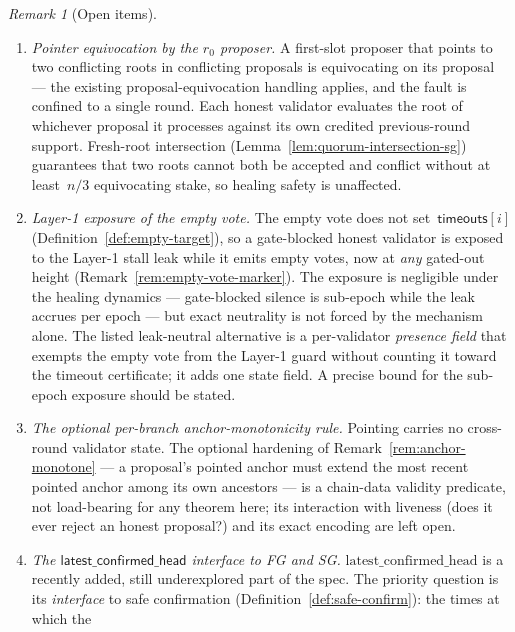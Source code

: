 \ifx\litemode\undefined\documentclass{article}\fi
\newcommand{\timeouts}{\mathsf{timeouts}}
\newcommand{\rzero}{\ensuremath{r_{0}}}                 %
\newcommand{\latestConfirmed}{\textsf{latest\_confirmed\_head}\xspace}
\theoremstyle{plain}
\theoremstyle{definition}
\theoremstyle{remark}
\newtheorem{remark}[theorem]{Remark}
\begin{document}
\begin{remark}[Open items]
\begin{enumerate}[label=(\arabic*)]
    stabilization beyond Goldfish requires \(2/3\) support in any case
    (Remark~\ref{rem:sub-two-thirds}), and finality-restoration in this regime is
    left to the leak (Theorem~\ref{thm:tightness}).
  \item \emph{Pointer equivocation by the \(\rzero\) proposer.}
    A first-slot proposer that points to two conflicting roots in
    conflicting proposals is equivocating on its proposal --- the existing
    proposal-equivocation handling applies, and the fault is confined to a single
    round.  Each honest validator evaluates the root of whichever proposal it
    processes against its own credited previous-round support.  Fresh-root
    intersection (Lemma~\ref{lem:quorum-intersection-sg}) guarantees that two
    roots cannot both be accepted and conflict without at least~\(n/3\)
    equivocating stake, so healing safety is unaffected.
  \item \emph{Layer-1 exposure of the empty vote.}
    The empty vote does not set~\(\timeouts[i]\)
    (Definition~\ref{def:empty-target}), so a gate-blocked honest validator is
    exposed to the Layer-1 stall leak while it emits empty votes, now at
    \emph{any} gated-out height (Remark~\ref{rem:empty-vote-marker}).  The
    exposure is negligible under the healing dynamics --- gate-blocked silence is
    sub-epoch while the leak accrues per epoch --- but exact neutrality is not
    forced by the mechanism alone.  The listed leak-neutral alternative is a
    per-validator \emph{presence field} that exempts the empty vote from the
    Layer-1 guard without counting it toward the timeout certificate; it adds one
    state field.  A precise bound for the sub-epoch exposure should be stated.
  \item \emph{The optional per-branch anchor-monotonicity rule.}
    Pointing carries no cross-round validator state.  The optional hardening of
    Remark~\ref{rem:anchor-monotone} --- a proposal's pointed anchor must extend
    the most recent pointed anchor among its own ancestors --- is a chain-data
    validity predicate, not load-bearing for any theorem here; its interaction
    with liveness (does it ever reject an honest proposal?) and its exact
    encoding are left open.
  \item \emph{The \(\latestConfirmed\) interface to FG and SG.}
    \(\mathrm{latest\_confirmed\_head}\) is a recently added, still underexplored
    part of the spec.  The priority question is its \emph{interface} to safe
    confirmation (Definition~\ref{def:safe-confirm}): the times at which the

\end{enumerate}
\end{remark}
\end{document}
